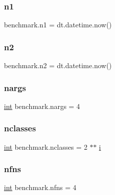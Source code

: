 \mbox{\label{namespacebenchmark_a6fb7f885fb53a5264b524e52be7c7fed}} 
\subsubsection{\texorpdfstring{n1}{n1}}
{\footnotesize\ttfamily benchmark.\+n1 = dt.\+datetime.\+now()}

\mbox{\label{namespacebenchmark_a5a772e99afcb2da6f2ca2237dbb48840}} 
\subsubsection{\texorpdfstring{n2}{n2}}
{\footnotesize\ttfamily benchmark.\+n2 = dt.\+datetime.\+now()}

\mbox{\label{namespacebenchmark_aad31ff2d4ed162d708367b63f9484c97}} 
\subsubsection{\texorpdfstring{nargs}{nargs}}
{\footnotesize\ttfamily \mbox{\hyperlink{warnings_8h_a74f207b5aa4ba51c3a2ad59b219a423b}{int}} benchmark.\+nargs = 4}

\mbox{\label{namespacebenchmark_ae3ff13572a7f8a6a9bf2bff520478379}} 
\subsubsection{\texorpdfstring{nclasses}{nclasses}}
{\footnotesize\ttfamily \mbox{\hyperlink{warnings_8h_a74f207b5aa4ba51c3a2ad59b219a423b}{int}} benchmark.\+nclasses = 2 $\ast$$\ast$ \mbox{\hyperlink{abstract_8h_a13235ab5ddf5c2ccd5ca35ab01d91328}{i}}}

\mbox{\label{namespacebenchmark_a08ef92e0d411609912c8368efd85e34e}} 
\subsubsection{\texorpdfstring{nfns}{nfns}}
{\footnotesize\ttfamily \mbox{\hyperlink{warnings_8h_a74f207b5aa4ba51c3a2ad59b219a423b}{int}} benchmark.\+nfns = 4}

